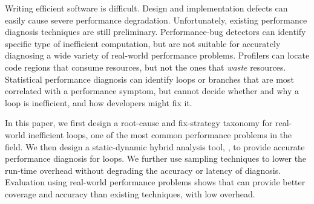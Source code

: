 Writing efficient software is difficult.
Design and implementation defects can easily
cause severe performance 
degradation. 
Unfortunately, existing performance diagnosis techniques are still preliminary.
Performance-bug detectors can identify specific type
of inefficient computation, but are not suitable for accurately diagnosing
a wide variety of real-world performance problems. 
Profilers can locate code regions that consume resources, but 
not the ones that \textit{waste} resources.
Statistical performance diagnosis can
identify loops or branches that are most correlated with a performance
symptom, but cannot decide whether and why a loop is inefficient, and
how developers might fix it.

In this paper, we first design a root-cause
and fix-strategy taxonomy for real-world inefficient loops, 
one of the most common performance problems in the field.
We then design a static-dynamic hybrid analysis tool, \Tool, to
provide accurate performance diagnosis for loops.
We further use sampling techniques to lower the run-time overhead without
degrading the accuracy or latency of \Tool diagnosis. 
Evaluation using real-world performance
problems shows that \Tool can provide better coverage and accuracy than
existing techniques, with low overhead.
